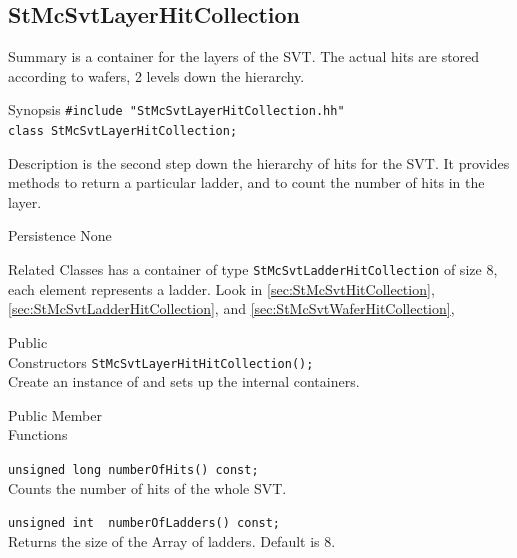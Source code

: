 \subsection{StMcSvtLayerHitCollection}
 
\label{sec:StMcSvtLayerHitCollection}
\begin{Entry}
\item[Summary]
     is a container for the
    layers of the SVT.  The actual hits are stored according to
    wafers, 2 levels down the hierarchy.

\item[Synopsis]
    \verb+#include "StMcSvtLayerHitCollection.hh"+\\
    \verb+class StMcSvtLayerHitCollection;+\\

\item[Description]
     is the second step down
    the hierarchy of hits for the SVT.  It provides
    methods to return a particular ladder, and to
    count the number of hits in the layer.

\item[Persistence]
    None

\item[Related Classes]
    has a container of type {\tt StMcSvtLadderHitCollection}
    of size 8, each element represents a ladder.  Look in
     \ref{sec:StMcSvtHitCollection},
     \ref{sec:StMcSvtLadderHitCollection},
    and  \ref{sec:StMcSvtWaferHitCollection},

\item[Public\\ Constructors]
    \verb+StMcSvtLayerHitHitCollection();+\\
    Create an instance of 
    and sets up the internal containers.

\item[Public Member\\ Functions]

    \verb+unsigned long numberOfHits() const;+\\
    Counts the number of hits of the whole SVT.

    \verb+unsigned int  numberOfLadders() const;+\\
    Returns the size of the Array of ladders.  Default is 8.


\end{Entry}
